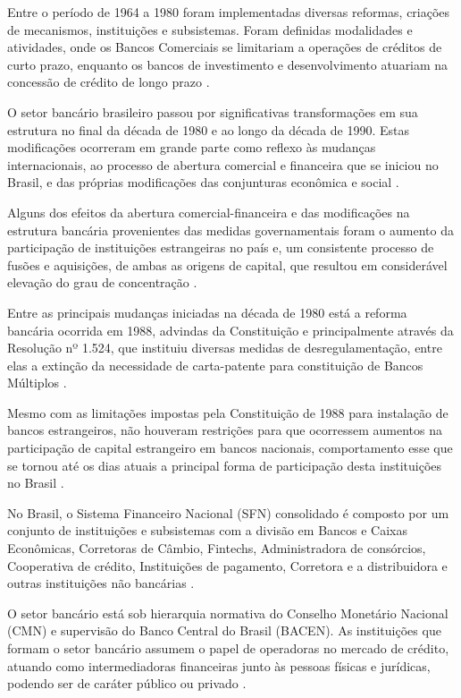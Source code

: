 \documentclass[
  12pt,
  12pt,
  openright,
  oneside,
  a4paper,
  chapter=TITLE,
  section=TITLE,
  subsection=TITLE,
  subsubsection=TITLE,
  english,
  portugues,
  sumario=tradicional]{abntex2}
\begin{document}
Entre o período de 1964 a 1980 foram implementadas diversas reformas, criações de mecanismos, instituições e subsistemas. Foram definidas modalidades e atividades, onde os Bancos Comerciais se limitariam a operações de créditos de curto prazo, enquanto os bancos de investimento e desenvolvimento atuariam na concessão de crédito de longo prazo \cite{camargo:2009}.

O setor bancário brasileiro passou por significativas transformações em sua estrutura no final da década de 1980 e ao longo da década de 1990. Estas modificações ocorreram em grande parte como reflexo às mudanças internacionais, ao processo de abertura comercial e financeira que se iniciou no Brasil, e das próprias modificações das conjunturas econômica e social \cite{camargo:2009}.

Alguns dos efeitos da abertura comercial-financeira e das modificações na estrutura bancária provenientes das medidas governamentais foram o aumento da participação de instituições estrangeiras no país e, um consistente processo de fusões e aquisições, de ambas as origens de capital, que resultou em considerável elevação do grau de concentração \cite{camargo:2009}.

Entre as principais mudanças iniciadas na década de 1980 está a reforma bancária ocorrida em 1988, advindas da Constituição e principalmente através da Resolução nº 1.524, que instituiu diversas medidas de desregulamentação, entre elas a extinção da necessidade de carta-patente para constituição de Bancos Múltiplos \cite{Res:1524:1988}.

Mesmo com as limitações impostas pela Constituição de 1988 \cite{constituicao:1988} para instalação de bancos estrangeiros, não houveram restrições para que ocorressem aumentos na participação de capital estrangeiro em bancos nacionais, comportamento esse que se tornou até os dias atuais a principal forma de participação desta instituições no Brasil \cite{camargo:2009}.

No Brasil, o Sistema Financeiro Nacional (SFN) consolidado é composto por um conjunto de instituições e subsistemas com a divisão em Bancos e Caixas Econômicas, Corretoras de Câmbio, Fintechs, Administradora de consórcios, Cooperativa de crédito, Instituições de pagamento, Corretora e a distribuidora e outras instituições não bancárias \cite{Lei:4595:1964}.

O setor bancário está sob hierarquia normativa do Conselho Monetário Nacional (CMN) e supervisão do Banco Central do Brasil (BACEN). As instituições que formam o setor bancário assumem o papel de operadoras no mercado de crédito, atuando como intermediadoras financeiras junto às pessoas físicas e jurídicas, podendo ser de caráter público ou privado \cite{Lei:4595:1964}.
\end{document}
